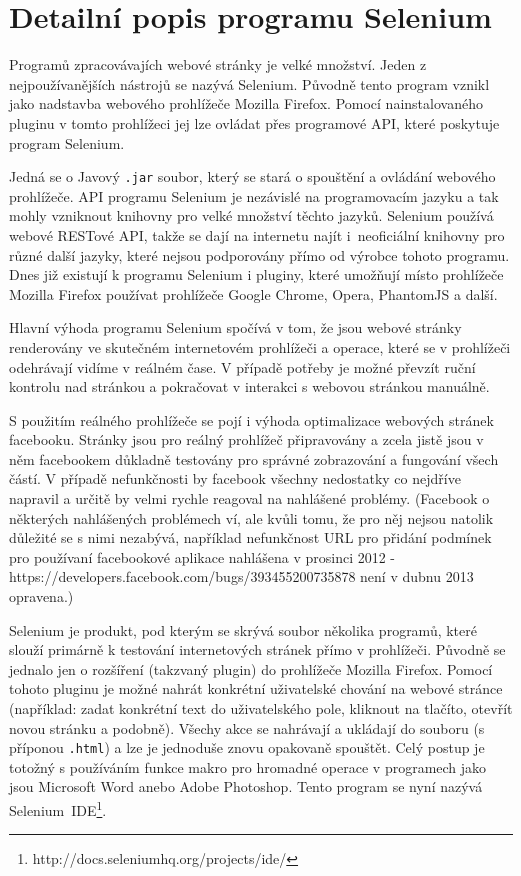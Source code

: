 \documentclass[thesis=M,czech]{FITthesis}[2013/05/10]
\begin{document}
\section{Detailní popis programu Selenium}

Programů zpracovávajích webové stránky je velké množství. Jeden z nejpoužívanějších nástrojů se nazývá Selenium. Původně tento program vznikl jako nadstavba webového prohlížeče Mozilla Firefox. Pomocí nainstalovaného pluginu v tomto prohlížeci jej lze ovládat přes programové API, které poskytuje program Selenium. 

Jedná se o Javový \verb|.jar| soubor, který se stará o spouštění a ovládání webového prohlížeče. API programu Selenium je nezávislé na programovacím jazyku a tak mohly vzniknout knihovny pro velké množství těchto jazyků. Selenium používá webové RESTové API, takže se dají na internetu najít i~neoficiální knihovny pro různé další jazyky, které nejsou podporovány přímo od výrobce tohoto programu. Dnes již existují k programu Selenium i pluginy, které umožňují místo prohlížeče Mozilla Firefox používat prohlížeče Google Chrome, Opera, PhantomJS a další.

Hlavní výhoda programu Selenium spočívá v tom, že jsou webové stránky renderovány ve skutečném internetovém prohlížeči a operace, které se v prohlížeči odehrávají vidíme v reálném čase. V případě potřeby je možné převzít ruční kontrolu nad stránkou a pokračovat v interakci s webovou stránkou manuálně. 

S použitím reálného prohlížeče se pojí i výhoda optimalizace webových stránek facebooku. Stránky jsou pro reálný prohlížeč připravovány a zcela jistě jsou v něm facebookem důkladně testovány pro správné 
zobrazování a fungování všech částí. V případě nefunkčnosti by facebook všechny nedostatky co nejdříve napravil a určitě by velmi rychle reagoval na nahlášené problémy. (Facebook o některých nahlášených problémech ví, ale kvůli tomu, že pro něj nejsou natolik důležité se s nimi nezabývá, například nefunkčnost URL pro přidání podmínek pro používaní facebookové aplikace  nahlášena v prosinci 2012 - https://developers.facebook.com/bugs/393455200735878  není v dubnu 2013 opravena.) 

Selenium je produkt, pod kterým se skrývá soubor několika programů, které slouží primárně k testování internetových stránek přímo v prohlížeči. Původně se jednalo jen o rozšíření (takzvaný plugin) do prohlížeče Mozilla Firefox. Pomocí tohoto pluginu je možné nahrát konkrétní uživatelské chování na webové stránce (například: zadat konkrétní text do uživatelského pole, kliknout na tlačíto, otevřít novou stránku a podobně). Všechy akce se nahrávají a ukládají do souboru (s příponou \verb|.html|) a lze je jednoduše znovu opakovaně spouštět. Celý postup je totožný s používáním funkce makro pro hromadné operace v programech jako jsou Microsoft Word anebo Adobe Photoshop. Tento program se nyní nazývá Selenium~IDE\footnote{http://docs.seleniumhq.org/projects/ide/}.
\end{document}
